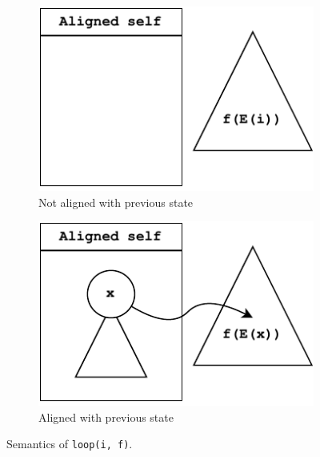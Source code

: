 \begin{figure}
    \centering
    \begin{subfigure}[b]{0.47\textwidth}
        \centering
        \includegraphics[width=\textwidth]{figures/semantics/loop-init.pdf}
        \caption{Not aligned with previous state}
        \label{fig:semantics-loop-init}
    \end{subfigure}
    \hfill
    \begin{subfigure}[b]{0.47\textwidth}
        \centering
        \includegraphics[width=\textwidth]{figures/semantics/loop-next.pdf}
        \caption{Aligned with previous state}
        \label{fig:semantics-loop-next}
    \end{subfigure}
    \caption{Semantics of \texttt{loop(i, f)}.}
    \label{fig:semantics-loop}
\end{figure}

